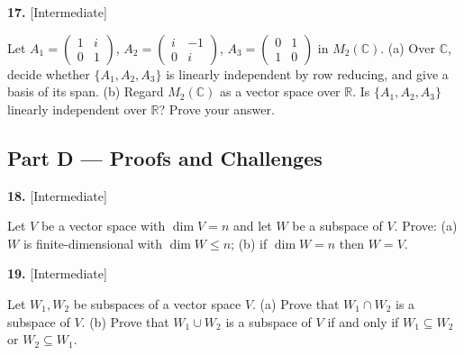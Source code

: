 \documentclass[11pt]{article}
\begin{document}
\begin{minipage}{\linewidth}\textbf{17.} \hfill{\scriptsize\color{ink}[Intermediate]}\par\nopagebreak Let $A_1=\begin{pmatrix}1&i\\0&1\end{pmatrix}$, $A_2=\begin{pmatrix}i&-1\\0&i\end{pmatrix}$, $A_3=\begin{pmatrix}0&1\\1&0\end{pmatrix}$ in $M_2(\mathbb{C})$. (a) Over $\mathbb{C}$, decide whether $\{A_1,A_2,A_3\}$ is linearly independent by row reducing, and give a basis of its span. (b) Regard $M_2(\mathbb{C})$ as a vector space over $\mathbb{R}$. Is $\{A_1,A_2,A_3\}$ linearly independent over $\mathbb{R}$? Prove your answer.
\vspace{5.9cm}\end{minipage}\par\vspace{4pt}
\subsection*{\normalsize\color{ink} Part D --- Proofs and Challenges}
\begin{minipage}{\linewidth}\textbf{18.} \hfill{\scriptsize\color{ink}[Intermediate]}\par\nopagebreak Let $V$ be a vector space with $\dim V=n$ and let $W$ be a subspace of $V$. Prove: (a) $W$ is finite-dimensional with $\dim W\le n$; (b) if $\dim W=n$ then $W=V$.
\vspace{5.1cm}\end{minipage}\par\vspace{4pt}
\begin{minipage}{\linewidth}\textbf{19.} \hfill{\scriptsize\color{ink}[Intermediate]}\par\nopagebreak Let $W_1,W_2$ be subspaces of a vector space $V$. (a) Prove that $W_1\cap W_2$ is a subspace of $V$. (b) Prove that $W_1\cup W_2$ is a subspace of $V$ if and only if $W_1\subseteq W_2$ or $W_2\subseteq W_1$.
\vspace{5.2cm}\end{minipage}\par\vspace{4pt}
\end{document}
